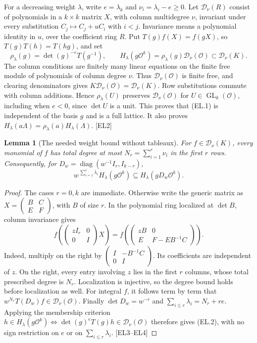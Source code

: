 \documentclass[11pt,a4paper]{article}
\numberwithin{equation}{section}
\newtheorem{lemma}[theorem]{Lemma}
\theoremstyle{remark}\newtheorem{remark}[theorem]{Remark}
\begin{document}
For a decreasing weight $\lambda$, write $e=\lambda_k$ and $\nu_i=\lambda_i-e\ge0$. Let $\mathcal D_\nu(R)$ consist of polynomials in a $k\times k$ matrix $X$, with column multidegree $\nu$, invariant under every substitution
$C_j\mapsto C_j+uC_i$ with $i<j$. Invariance means a polynomial identity in $u$, over the coefficient ring $R$. Put $T(g)f(X)=f(gX)$, so $T(g)T(h)=T(hg)$, and set
\[
 \rho_\lambda(g)=\det(g)^{-e}T(g^{-1}),\qquad
 H_\lambda(g\mathcal O^k)=\rho_\lambda(g)\mathcal D_\nu(\mathcal O)
 \subset \mathcal D_\nu(K).
 \tag{EL.1}
\]
The column conditions are finitely many linear equations on the finite free module of polynomials of column degree $\nu$. Thus $\mathcal D_\nu(\mathcal O)$ is finite free, and clearing denominators gives
$K\mathcal D_\nu(\mathcal O)=\mathcal D_\nu(K)$.
Row substitutions commute with column additions. Hence $\rho_\lambda(U)$ preserves $\mathcal D_\nu(\mathcal O)$ for $U\in\operatorname{GL}_k(\mathcal O)$, including when $e<0$, since $\det U$ is a unit. This proves that (EL.1) is independent of the basis $g$ and is a full lattice. It also proves
$H_\lambda(a\Lambda)=\rho_\lambda(a)H_\lambda(\Lambda)$.
\textsf{[EL2]}

\begin{lemma}[The needed weight bound without tableaux]
\label{lem:edge-weight}
For $f\in\mathcal D_\nu(K)$, every monomial of $f$ has total degree at most
$N_r=\sum_{i=1}^r\nu_i$ in the first $r$ rows. Consequently, for
$D_w=\operatorname{diag}(w^{-1}I_r,I_{k-r})$,
\[
 w^{\,\sum_{i=1}^r\lambda_i}H_\lambda(g\mathcal O^k)
 \subseteq H_\lambda(gD_w\mathcal O^k).
 \tag{EL.2}
\]
\end{lemma}
\begin{proof}
The cases $r=0,k$ are immediate. Otherwise write the generic matrix as
$X=\left(\begin{smallmatrix}B&C\\ E&F\end{smallmatrix}\right)$, with $B$ of size $r$.
In the polynomial ring localized at $\det B$, column invariance gives
\[
 f\!\left(\begin{pmatrix}zI_r&0\\0&I\end{pmatrix}X\right)
 =
 f\!\left(\begin{pmatrix}zB&0\\ E&F-EB^{-1}C\end{pmatrix}\right).
 \tag{EL.3}
\]
Indeed, multiply on the right by
$\left(\begin{smallmatrix}I&-B^{-1}C\\0&I\end{smallmatrix}\right)$.
Its coefficients are independent of $z$. On the right, every entry involving $z$ lies in the first $r$ columns, whose total prescribed degree is $N_r$.
Localization is injective, so the degree bound holds before localization as well. For integral $f$, it follows term by term that
$w^{N_r}T(D_w)f\in\mathcal D_\nu(\mathcal O)$.
Finally $\det D_w=w^{-r}$ and $\sum_{i\le r}\lambda_i=N_r+re$.
Applying the membership criterion
$h\in H_\lambda(g\mathcal O^k)\iff\det(g)^eT(g)h\in\mathcal D_\nu(\mathcal O)$
therefore gives (EL.2), with no sign restriction on $e$ or on $\sum_{i\le r}\lambda_i$.
\textsf{[EL3--EL4]}
\end{proof}
\end{document}
